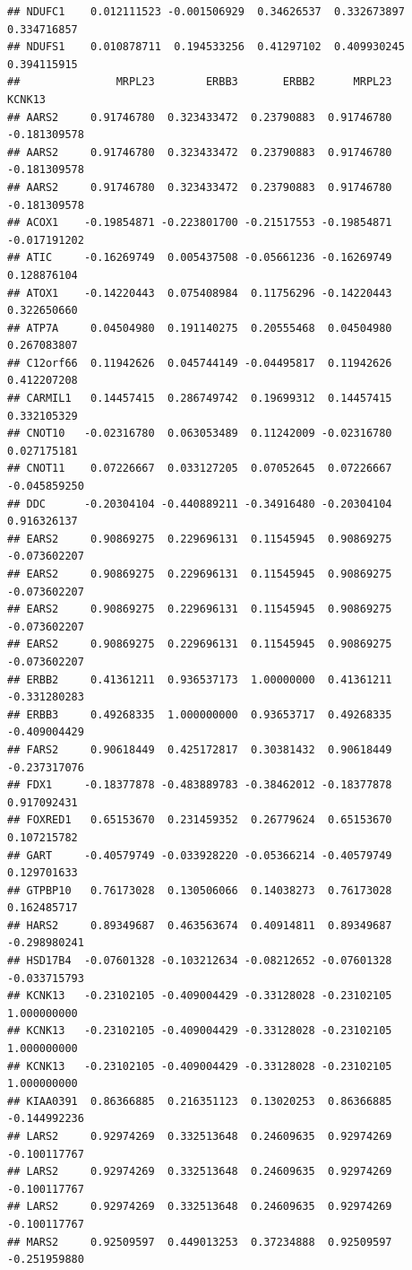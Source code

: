 \documentclass[
]{article}
\begin{document}
\begin{verbatim}
## NDUFC1    0.012111523 -0.001506929  0.34626537  0.332673897  0.334716857
## NDUFS1    0.010878711  0.194533256  0.41297102  0.409930245  0.394115915
##               MRPL23        ERBB3       ERBB2      MRPL23       KCNK13
## AARS2     0.91746780  0.323433472  0.23790883  0.91746780 -0.181309578
## AARS2     0.91746780  0.323433472  0.23790883  0.91746780 -0.181309578
## AARS2     0.91746780  0.323433472  0.23790883  0.91746780 -0.181309578
## ACOX1    -0.19854871 -0.223801700 -0.21517553 -0.19854871 -0.017191202
## ATIC     -0.16269749  0.005437508 -0.05661236 -0.16269749  0.128876104
## ATOX1    -0.14220443  0.075408984  0.11756296 -0.14220443  0.322650660
## ATP7A     0.04504980  0.191140275  0.20555468  0.04504980  0.267083807
## C12orf66  0.11942626  0.045744149 -0.04495817  0.11942626  0.412207208
## CARMIL1   0.14457415  0.286749742  0.19699312  0.14457415  0.332105329
## CNOT10   -0.02316780  0.063053489  0.11242009 -0.02316780  0.027175181
## CNOT11    0.07226667  0.033127205  0.07052645  0.07226667 -0.045859250
## DDC      -0.20304104 -0.440889211 -0.34916480 -0.20304104  0.916326137
## EARS2     0.90869275  0.229696131  0.11545945  0.90869275 -0.073602207
## EARS2     0.90869275  0.229696131  0.11545945  0.90869275 -0.073602207
## EARS2     0.90869275  0.229696131  0.11545945  0.90869275 -0.073602207
## EARS2     0.90869275  0.229696131  0.11545945  0.90869275 -0.073602207
## ERBB2     0.41361211  0.936537173  1.00000000  0.41361211 -0.331280283
## ERBB3     0.49268335  1.000000000  0.93653717  0.49268335 -0.409004429
## FARS2     0.90618449  0.425172817  0.30381432  0.90618449 -0.237317076
## FDX1     -0.18377878 -0.483889783 -0.38462012 -0.18377878  0.917092431
## FOXRED1   0.65153670  0.231459352  0.26779624  0.65153670  0.107215782
## GART     -0.40579749 -0.033928220 -0.05366214 -0.40579749  0.129701633
## GTPBP10   0.76173028  0.130506066  0.14038273  0.76173028  0.162485717
## HARS2     0.89349687  0.463563674  0.40914811  0.89349687 -0.298980241
## HSD17B4  -0.07601328 -0.103212634 -0.08212652 -0.07601328 -0.033715793
## KCNK13   -0.23102105 -0.409004429 -0.33128028 -0.23102105  1.000000000
## KCNK13   -0.23102105 -0.409004429 -0.33128028 -0.23102105  1.000000000
## KCNK13   -0.23102105 -0.409004429 -0.33128028 -0.23102105  1.000000000
## KIAA0391  0.86366885  0.216351123  0.13020253  0.86366885 -0.144992236
## LARS2     0.92974269  0.332513648  0.24609635  0.92974269 -0.100117767
## LARS2     0.92974269  0.332513648  0.24609635  0.92974269 -0.100117767
## LARS2     0.92974269  0.332513648  0.24609635  0.92974269 -0.100117767
## MARS2     0.92509597  0.449013253  0.37234888  0.92509597 -0.251959880

\end{verbatim}
\end{document}
